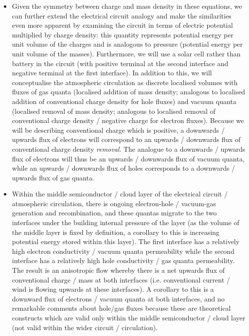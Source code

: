 \begin{itemize}
	\item Given the symmetry between charge and mass density in these equations, we can further extend the electrical circuit analogy and make the similarities even more apparent by examining the circuit in terms of electric potential multiplied by charge density: this quantity represents potential energy per unit volume of the charges and is analogous to pressure (potential energy per unit volume of the masses). Furthermore, we will use a solar cell rather than battery in the circuit (with positive terminal at the second interface and negative terminal at the first interface). In addition to this, we will conceptualise the atmospheric circulation as discrete localised volumes with fluxes of gas quanta (localised addition of mass density; analogous to localised addition of conventional charge density for hole fluxes) and vacuum quanta (localised removal of mass density; analogous to localised removal of conventional charge density / negative charge for electron fluxes). Because we will be describing conventional charge which is positive, a downwards / upwards flux of electrons will correspond to an upwards / downwards flux of conventional charge density \textit{removal}. The analogue to a downwards / upwards flux of electrons will thus be an upwards / downwards flux of vacuum quanta, while an upwards / downwards flux of holes corresponds to a downwards / upwards flux of gas quanta.
	\item Within the middle semiconductor / cloud layer of the electrical circuit / atmospheric circulation, there is ongoing electron-hole / vacuum-gas generation and recombination, and these quantas migrate to the two interfaces under the building internal pressure of the layer (as the volume of the middle layer is fixed by definition, a corollary to this is increasing potential energy stored within this layer). The first interface has a relatively high electron conductivity / vacuum quanta permeability while the second interface has a relatively high hole conductivity / gas quanta permeability. The result is an anisotropic flow whereby there is a net upwards flux of conventional charge / mass at both interfaces (i.e. conventional current / wind is flowing upwards at these interfaces). A corollary to this is a downward flux of electrons / vacuum quanta at both interfaces, and no remarkable comments about hole/gas fluxes because these are theoretical constructs which are valid only within the middle semiconductor / cloud layer (not valid within the wider circuit / circulation).
\end{itemize}

